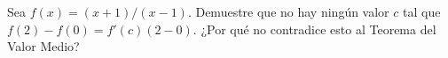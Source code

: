 \item Sea $f(x) = (x + 1)/(x - 1)$. Demuestre que no hay ningún valor $c$ tal que $f(2) - f(0) = f'(c)(2 - 0)$. ¿Por qué no contradice esto al Teorema del Valor Medio?
